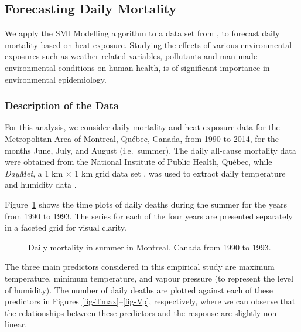 \documentclass[
  11pt,
  a4paper,
]{article}
\begin{document}
\subsection{Forecasting Daily Mortality}\label{sec-mortality}

We apply the SMI Modelling algorithm to a data set from
\textcite{Masselot2022}, to forecast daily mortality based on heat
exposure. Studying the effects of various environmental exposures such
as weather related variables, pollutants and man-made environmental
conditions on human health, is of significant importance in
environmental epidemiology.

\subsubsection{Description of the Data}\label{description-of-the-data}

For this analysis, we consider daily mortality and heat exposure data
for the Metropolitan Area of Montreal, Québec, Canada, from 1990 to
2014, for the months June, July, and August (i.e.~summer). The daily
all-cause mortality data were obtained from the National Institute of
Public Health, Québec, while \emph{DayMet}, a 1 km × 1 km grid data set
\autocite{Thornton2021}, was used to extract daily temperature and
humidity data \autocite{Masselot2022}.

Figure~\ref{fig-deaths} shows the time plots of daily deaths during the
summer for the years from 1990 to 1993. The series for each of the four
years are presented separately in a faceted grid for visual clarity.

\begin{figure}


\caption{\label{fig-deaths}Daily mortality in summer in Montreal, Canada
from 1990 to 1993.}

\end{figure}%

The three main predictors considered in this empirical study are maximum
temperature, minimum temperature, and vapour pressure (to represent the
level of humidity). The number of daily deaths are plotted against each
of these predictors in Figures \ref{fig-Tmax}--\ref{fig-Vp},
respectively, where we can observe that the relationships between these
predictors and the response are slightly non-linear.
\end{document}
